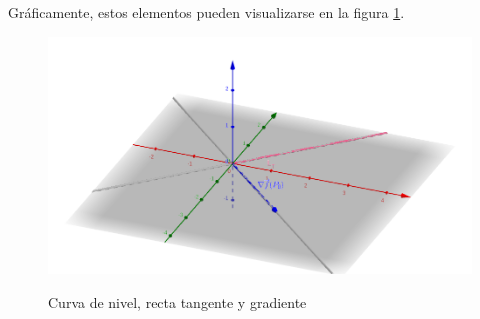 \documentclass{article}
\begin{document}
Gráficamente, estos elementos pueden visualizarse en la figura \ref{fig:1-e-2-2}.

\begin{figure}[ht]
\caption{Curva de nivel, recta tangente y gradiente}
\includegraphics[scale=0.25]{img/ejercicios/3/1-e-2-2.png} 
\centering
\label{fig:1-e-2-2}
\end{figure}
\end{document}
